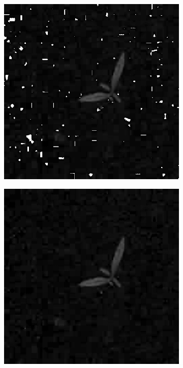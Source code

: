 \begin{figure}[]
\begin{subfigure}[b]{0.3\textwidth}
        \caption{}
		\label{fig:seg_b}
    \end{subfigure}
    \begin{subfigure}[b]{0.3\textwidth}
        \centering
        \includegraphics[width=\textwidth]{./figure/result/segmentation/imgHSI1.png}
		\caption{}
		\label{fig:seg_c}
    \end{subfigure}
    \begin{subfigure}[b]{0.3\textwidth}
        \centering
        \includegraphics[width=\textwidth]{./figure/result/segmentation/imgHSIClean.png}

\end{subfigure}
\end{figure}
